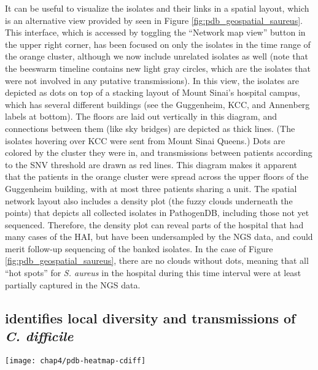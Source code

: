 It can be useful to visualize the isolates and their links in a spatial layout, which is an alternative view provided by \pathogendbviz{} seen in Figure \ref{fig:pdb_geospatial_saureus}. This interface, which is accessed by toggling the ``Network map view'' button in the upper right corner, has been focused on only the isolates in the time range of the orange cluster, although we now include unrelated isolates as well (note that the beeswarm timeline contains new light gray circles, which are the isolates that were not involved in any putative transmissions). In this view, the isolates are depicted as dots on top of a stacking layout of Mount Sinai's hospital campus, which has several different buildings (see the Guggenheim, KCC, and Annenberg labels at bottom). The floors are laid out vertically in this diagram, and connections between them (like sky bridges) are depicted as thick lines. (The isolates hovering over KCC were sent from Mount Sinai Queens.) Dots are colored by the cluster they were in, and transmissions between patients according to the SNV threshold are drawn as red lines. This diagram makes it apparent that the patients in the orange cluster were spread across the upper floors of the Guggenheim building, with at most three patients sharing a unit. The spatial network layout also includes a density plot (the fuzzy clouds underneath the points) that depicts all collected isolates in PathogenDB, including those not yet sequenced. Therefore, the density plot can reveal parts of the hospital that had many cases of the HAI, but have been undersampled by the NGS data, and could merit follow-up sequencing of the banked isolates. In the case of Figure \ref{fig:pdb_geospatial_saureus}, there are no clouds without dots, meaning that all ``hot spots'' for \emph{S. aureus} in the hospital during this time interval were at least partially captured in the NGS data.

\subsection{\pathogendbviz{} identifies local diversity and transmissions of \emph{C. difficile}}

\begin{sidewaysfigure}[hp]
  \sidewaysvspace
  \centering
  \texttt{[image: chap4/pdb-heatmap-cdiff]}               
\end{sidewaysfigure}

